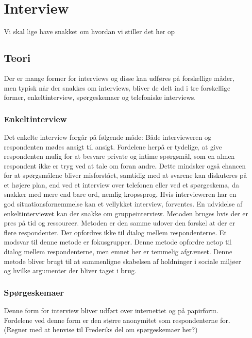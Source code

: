 \chapter{Interview}
Vi skal lige have snakket om hvordan vi stiller det her op
\section{Teori}
Der er mange former for interviews og disse kan udføres på forskellige måder, men typisk når der snakkes om interviews, bliver de delt ind i tre forskellige former, enkeltinterview, spørgeskemaer og telefoniske interviews.

\subsection{Enkeltinterview}
Det enkelte interview forgår på følgende måde: Både intervieweren og respondenten mødes ansigt til ansigt. Fordelene herpå er tydelige, at give respondenten mulig for at besvare private og intime spørgsmål, som en almen respondent ikke er tryg ved at tale om foran andre. Dette mindsker også chancen for at spørgsmålene bliver misforstået, samtidig med at svarene kan diskuteres på et højere plan, end ved et interview over telefonen eller ved et spørgeskema, da snakker med mere end bare ord, nemlig kropssprog. Hvis intervieweren har en god situationsfornemmelse kan et vellykket interview, forventes. 
En udvidelse af enkeltinterviewet kan der snakke om gruppeinterview. Metoden bruges hvis der er pres på tid og ressourcer. Metoden er den samme udover den forskel at der er flere respondenter. Der opfordres ikke til dialog mellem respondenterne. Et modsvar til denne metode er fokusgrupper. Denne metode opfordre netop til dialog mellem respondenterne, men emnet her er temmelig afgrænset. Denne metode bliver brugt til at sammenligne skabelsen af holdninger i sociale miljøer og hvilke argumenter der bliver taget i brug. 

\subsection{Spørgeskemaer}
Denne form for interview bliver udført over internettet og på papirform. Fordelene ved denne form er den større anonymitet som respondenterne for. (Regner med at henvise til Frederiks del om spørgeskemaer her?)

